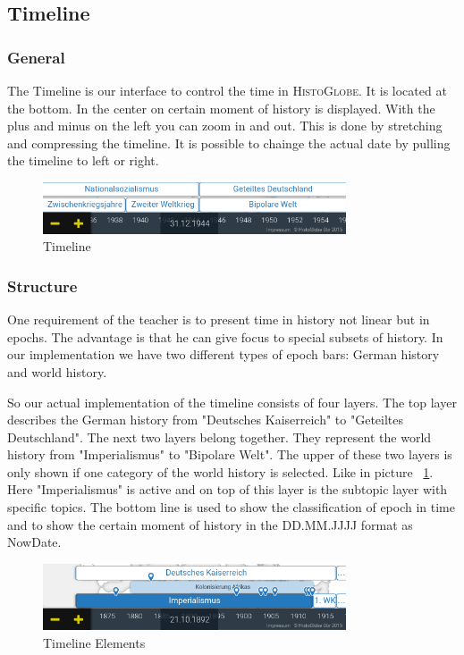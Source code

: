 \subsection{Timeline} %
\label{sub:timeline}

\subsubsection{General}
The Timeline is our interface to control the time in \textsc{HistoGlobe}. It is located at the bottom. In the center on certain moment of history is displayed. With the plus and minus on the left you can zoom in and out. This is done by stretching and compressing the timeline. It is possible to chainge the actual date by pulling the timeline to left or right.

\begin{figure}[H]
	\centering
	\includegraphics[width=0.8\textwidth]{graphics/timeline_now.png}
	\caption{Timeline}
\end{figure}

\subsubsection{Structure}
One requirement of the teacher is to present time in history not linear but in epochs. The advantage is that he can give focus to special subsets of history. In our implementation we have two different types of epoch bars: German history and world history.

So our actual implementation of the timeline consists of four layers. The top layer describes the German history from "Deutsches Kaiserreich" to "Geteiltes Deutschland". The next two layers belong together. They represent the world history from "Imperialismus" to "Bipolare Welt". The upper of these two layers is only shown if one category of the world history is selected. Like in picture ~\ref{fig:Timeline_Elements}. Here "Imperialismus" is active and on top of this layer is the subtopic layer with specific topics. The bottom line is used to show the classification of epoch in time and to show the certain moment of history in the DD.MM.JJJJ format as NowDate.

\begin{figure}[H]
	\centering
	\includegraphics[width=0.8\textwidth]{graphics/timeline_elements.png}
	\caption{Timeline Elements}
	\label{fig:Timeline_Elements}
\end{figure}



